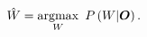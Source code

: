 \begin{equation}
  \hat{W} = \operatorname*{argmax}_W\ P\left(W | \boldsymbol{O}\right).
  \label{eq:asr:decoding}
\end{equation}











